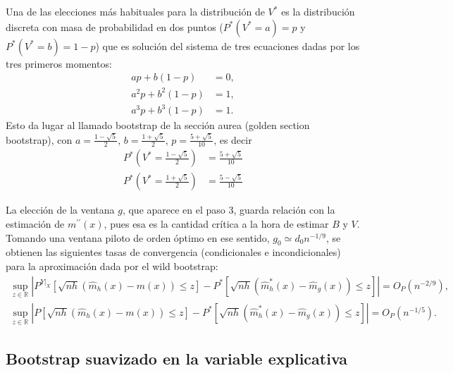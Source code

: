 \documentclass[
]{book}
\theoremstyle{break}
\theoremstyle{nonumberplain}
\begin{document}
Una de las elecciones más habituales para la distribución de
\(V^{\ast}\) es la distribución discreta con masa de probabilidad en dos
puntos (\(P^{\ast}\left( V^{\ast}=a \right) =p\) y
\(P^{\ast}\left( V^{\ast}=b \right) =1-p\)) que es solución del sistema
de tres ecuaciones dadas por los tres primeros momentos:
\[\begin{aligned}
ap+b\left( 1-p \right) &= 0, \\
a^2p+b^2\left( 1-p \right) &= 1, \\
a^{3}p+b^{3}\left( 1-p \right) &= 1.
\end{aligned}\]
Esto da lugar al llamado bootstrap de la sección aurea
(golden section bootstrap), con
\(a=\frac{1-\sqrt{5}}{2}\), \(b=\frac{1+\sqrt{5}}{2}\), \(p=\frac{
5+\sqrt{5}}{10}\), es decir
\[\begin{aligned}
P^{\ast}\left( V^{\ast}=\frac{1-\sqrt{5}}{2} \right) &= \frac{5+\sqrt{5}}{10} \\
P^{\ast}\left( V^{\ast}=\frac{1+\sqrt{5}}{2} \right) &= \frac{5-\sqrt{5}}{10}
\end{aligned}\]

La elección de la ventana \(g\), que aparece en el paso 3, guarda relación
con la estimación de \(m^{\prime \prime }\left( x \right)\), pues esa es
la cantidad crítica a la hora de estimar \(B\) y \(V\). Tomando una ventana
piloto de orden óptimo en ese sentido, \(g_{0}\simeq d_{0}n^{-1/9}\),
se obtienen las siguientes tasas de convergencia (condicionales e
incondicionales) para la aproximación dada por el wild bootstrap:
\[\begin{gathered}
\sup_{z\in \mathbb{R}} \left\vert P^{\left. Y\right\vert _{X}}\left[ 
\sqrt{nh}\left( \hat{m}_{h}\left( x \right) -m\left( x \right) \right) \leq z
\right] - P^{\ast}\left[ \sqrt{nh}\left( \hat{m}_{h}^{\ast}\left( x \right) -
\hat{m}_{g}\left( x \right) \right) \leq z\right] \right\vert = O_{P}\left( n^{-2/9} \right), 
\\
\sup_{z\in \mathbb{R}} \left\vert P\left[ \sqrt{nh}\left( \hat{m}
_{h}\left( x \right) -m\left( x \right) \right) \leq z\right] 
 - P^{\ast}\left[ \sqrt{nh}\left( \hat{m}_{h}^{\ast}\left( x \right) -\hat{m}_{g}\left(
x \right) \right) \leq z\right] \right\vert = O_{P}\left( n^{-1/5} \right).
\end{gathered}\]

\subsection{Bootstrap suavizado en la variable explicativa}\label{bootstrap-suavizado-en-la-variable-explicativa}
\end{document}
